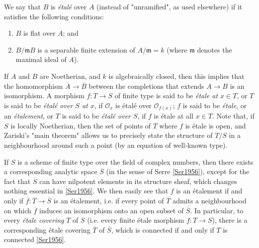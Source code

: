   We say that \(B\) is \emph{étalé} over \(A\) (instead of "unramified", as used elsewhere) if it satisfies the following conditions:

  
 \begin{enumerate}
    
 \item[i.]
      \(B\) is flat over \(A\); and
    

    
 \item[ii.]
      \(B/\mathfrak {m}B\) is a separable finite extension of \(A/\mathfrak {m}=k\) (where \(\mathfrak {m}\) denotes the maximal ideal of \(A\)).
    

  \end{enumerate}


  If \(A\) and \(B\) are Noetherian, and \(k\) is algebraically closed, then this implies that the homomorphism \(\overline {A}\to \overline {B}\) between the completions that extends \(A\to  B\) is an isomorphism.
  A morphism \(f\colon  T\to  S\) of finite type is said to be \emph{étale at \(x\in  T\)}, or \(T\) is said to be \emph{étalé over \(S\) at \(x\)}, if \(\mathscr {O}_x\) is étalé over \(\mathscr {O}_{f(x)}\);
  \(f\) is said to be \emph{étale}, or an \emph{étalement}, or \(T\) is said to be \emph{étalé over \(S\)}, if \(f\) is étale at all \(x\in  T\).
  Note that, if \(S\) is locally Noetherian, then the set of points of \(T\) where \(f\) is étale is open, and Zariski's "main theorem" allows us to precisely state the structure of \(T/S\) in a neighbourhood around such a point (by an equation of well-known type).\par{}If \(S\) is a scheme of finite type over the field of complex numbers, then there exists a corresponding analytic space \(\overline {S}\) (in the sense of Serre \hyperref[Ser1956]{[Ser1956]}), except for the fact that \(\overline {S}\) can have nilpotent elements in its structure sheaf, which changes nothing essential in \hyperref[Ser1956]{[Ser1956]}.
  We then easily see that \(f\) is an étalement if and only if \(\overline {f}\colon \overline {T}\to \overline {S}\) is an étalement, i.e. if every point of \(\overline {T}\) admits a neighbourhood on which \(\overline {f}\) induces an isomorphism onto an open subset of \(\overline {S}\).
  In particular, to every \emph{étale covering} \(T\) of \(S\) (i.e. every finite étale morphism \(f\colon  T\to  S\)), there is a corresponding étale covering \(\overline {T}\) of \(\overline {S}\), which is connected if and only if \(T\) is connected \hyperref[Ser1956]{[Ser1956]}.
